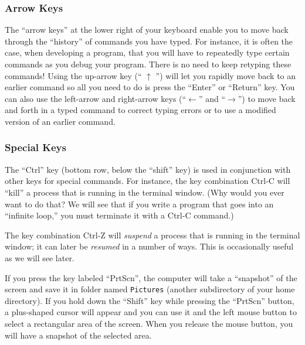 \vspace{-0.1in}
\subsubsection*{Arrow Keys}
\vspace{-0.1in}
The ``arrow keys'' at the lower right of your keyboard enable you to
move back through the ``history'' of commands you have typed. For instance,
it is often the case, when developing a program, that you will
have to repeatedly type certain commands
as you debug your program. There is no need to keep retyping these
commands! Using the up-arrow key (`` $\uparrow$ '') will let you rapidly
move back to an earlier command so all you need to do is press the 
``Enter'' or ``Return'' key. You can also use the left-arrow and 
right-arrow keys (``$\leftarrow$'' and ``$\rightarrow$'') to move back
and forth in a typed command to correct typing errors or to use a
modified version of an earlier command. 

\vspace{-0.1in}
\subsubsection*{Special Keys}
\vspace{-0.1in}
The ``Ctrl'' key (bottom row, below the ``shift'' key) is used in
conjunction with other keys for special commands. For
instance, the key combination Ctrl-C will ``kill'' a process that is
running in the terminal window. (Why would you ever want to do that?
We will see that if you write a program that goes into an ``infinite
loop,'' you must terminate it with a Ctrl-C command.)

\noindent The key combination Ctrl-Z will {\em suspend} a process that is
running in the terminal window; it can later be {\em resumed} in a
number of ways. This is occasionally useful as we will see later.

If you press the key labeled ``PrtScn'', the computer 
will take a ``snapshot'' of the screen and save it in 
folder named {\tt Pictures} (another subdirectory of your home directory).
If you hold down the ``Shift'' key while pressing the ``PrtScn'' button,
a plus-shaped cursor will appear and you can use it and the left mouse 
button to select a rectangular area of the screen. When you release the
mouse button, you will have a snapshot of the selected area.

